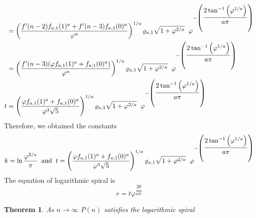 \documentclass[preprint,12pt]{elsarticle}
\newtheorem{theorem}{Theorem}[section]
\begin{document}
\begin{align*}
	  & =\left(\dfrac{f'(n-2)f_{a,1}(1)^a+f'(n-3)f_{a,1}(0)^a}{\varphi^{n}}\right)^{1/a}\varrho_{a,1}\sqrt{1 + \varphi^{2/a}}\hspace{2mm}\varphi^{-\left(\dfrac{ 2\tan^{-1}{\left(\varphi^{1/a}\right)}}{a\pi}\right)}    \\
	  & =\left(\dfrac{f'(n-3)(\varphi f_{a,1}(1)^a+f_{a,1}(0)^a)}{\varphi^{n}}\right)^{1/a}\varrho_{a,1}\sqrt{1 + \varphi^{2/a}}\hspace{2mm}\varphi^{-\left(\dfrac{ 2\tan^{-1}{\left(\varphi^{1/a}\right)}}{a\pi}\right)} \\
	t & =\left(\dfrac{\varphi f_{a,1}(1)^a+f_{a,1}(0)^a}{\varphi^{3}\sqrt{5}}\right)^{1/a}\varrho_{a,1}\sqrt{1 + \varphi^{2/a}}\hspace{2mm}\varphi^{-\left(\dfrac{ 2\tan^{-1}{\left(\varphi^{1/a}\right)}}{a\pi}\right)}  
\end{align*}
Therefore, we obtained the constants $$k = \ln{\dfrac{\varphi^{2/a}}{\pi}} \hspace{2mm}\text{and}\hspace{2mm}t=\left(\dfrac{\varphi f_{a,1}(1)^a+f_{a,1}(0)^a}{\varphi^{3}\sqrt{5}}\right)^{1/a}\varrho_{a,1}\sqrt{1 + \varphi^{2/a}}\hspace{2mm}\varphi^{-\left(\dfrac{ 2\tan^{-1}{\left(\varphi^{1/a}\right)}}{a\pi}\right)}$$
The equation of logarithmic spiral is $$r = t\varphi^{\dfrac{2\theta}{a\pi}}$$
\begin{theorem}
	As $n \to \infty$ $P(n)$ satisfies the logarithmic spiral
\end{theorem}
\end{document}
